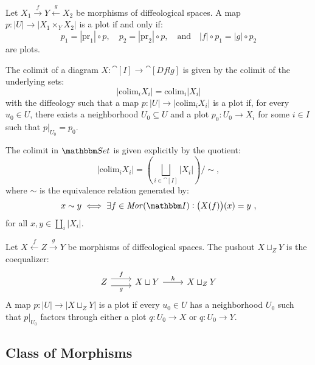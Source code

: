 \documentclass[a4paper,11pt]{article}  %
\newcommand{\Dflg}{\cat[Dflg]}
\begin{document}
\begin{example}[Pullbacks]\label{ex:dflg-pullback}
	Let \(X_1 \xrightarrow{f} Y \xleftarrow{g} X_2\) be morphisms of diffeological spaces. A map \(p : |U| \to |X_1 \times_Y X_2|\) is a plot if and only if:
	$$
		p_1 = |\mathrm{pr}_1| \circ p, \quad p_2 = |\mathrm{pr}_2| \circ p, \quad \text{and} \quad |f| \circ p_1 = |g| \circ p_2
	$$
	are plots.
\end{example}

\begin{proposition}
	The colimit of a diagram \(X : \cat[I] \to \Dflg\) is given by the colimit of the underlying sets:
	$$
		|\mathrm{colim}_i X_i| = \mathrm{colim}_i |X_i|
	$$
with the diffeology such that a map \(p : |U| \to |\mathrm{colim}_i X_i|\) is a plot if, for every \(u_0 \in U\), there exists a neighborhood \(U_0 \subseteq U\) and a plot \(p_0 :  U_0 \to X_i\) for some \(i \in I\) such that \(p|_{U_0} = p_0\).
\end{proposition}

\begin{remark}
The colimit in $\Set$ is given explicitly by the quotient:
$$
|\mathrm{colim}_i X_i| = \left( \bigsqcup_{i \in \cat[I]} |X_i| \right) / \sim,
$$
where \(\sim\) is the equivalence relation generated by:
$$
x \sim y \iff \exists f \in \Mor(\cat[I]) : \big(X(f)\big)(x) = y~,
$$
for all $x,y \in \coprod_i \vert X_i\vert$.
\end{remark}

\begin{example}[Pushouts]\label{ex:dflg-pushout}
Let \(X \xleftarrow{f} Z \xrightarrow{g} Y\) be morphisms of diffeological spaces. The pushout \(X \sqcup_Z Y\) is the coequalizer:
$$
			\begin{tikzcd}
				Z \ar[r, yshift=4px,"f"]\ar[r, yshift=-4px,"g"'] & X \sqcup Y \ar[r,"h"] & X \sqcup_Z Y
			\end{tikzcd}		
$$
A map \(p : |U| \to |X \sqcup_Z Y|\) is a plot if every \(u_0 \in U\) has a neighborhood \(U_0\) such that \(p|_{U_0}\) factors through either a plot \(q :  U_0 \to X\) or \(q :  U_0 \to Y\).
\end{example}


\subsection{Class of Morphisms}
\end{document}
